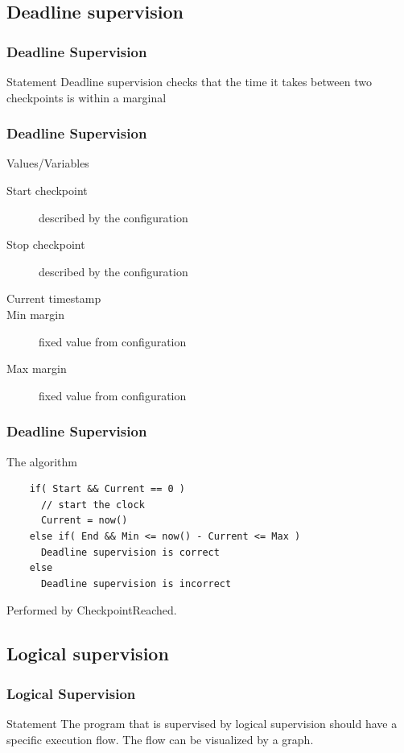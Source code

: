 \documentclass{beamer}
\begin{document}
\subsection{Deadline supervision}
\begin{frame}
  \frametitle{Deadline Supervision}
  \begin{block}{Statement}
    Deadline supervision checks that the time it takes between two
    checkpoints is within a marginal
  \end{block}
\end{frame}

\begin{frame}
  \frametitle{Deadline Supervision}
  \begin{block}{Values/Variables}
    \begin{description}
      \item[Start checkpoint] described by the configuration
      \item[Stop checkpoint] described by the configuration
      \item[Current timestamp]
      \item[Min margin] fixed value from configuration
      \item[Max margin] fixed value from configuration
    \end{description}
  \end{block}
\end{frame}

\begin{frame}[fragile]
  \frametitle{Deadline Supervision}
  \begin{block}{The algorithm}
    \begin{lstlisting}
    if( Start && Current == 0 )
      // start the clock
      Current = now()
    else if( End && Min <= now() - Current <= Max )
      Deadline supervision is correct
    else
      Deadline supervision is incorrect
    \end{lstlisting}
  \end{block}
  Performed by CheckpointReached.
\end{frame}

\subsection{Logical supervision}
\begin{frame}
  \frametitle{Logical Supervision}
  \begin{block}{Statement}
    The program that is supervised by logical supervision should have
    a specific execution flow. The flow can be visualized by a
    graph.
  \end{block}
\end{frame}
\end{document}
